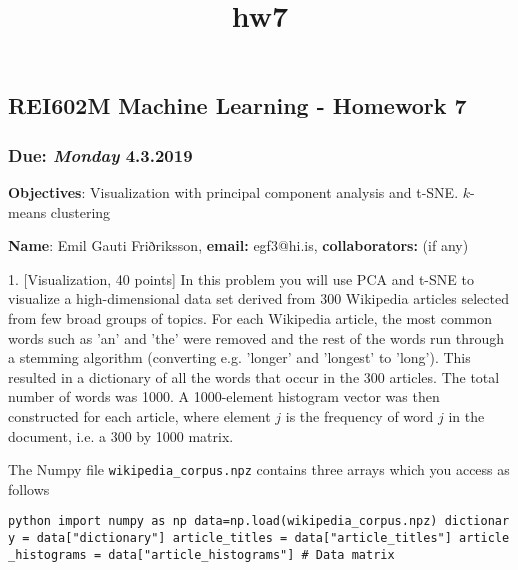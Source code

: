 \documentclass[11pt]{article}
\title{hw7}
\begin{document}
    
    
    \maketitle
    
    

    
    \subsection{REI602M Machine Learning - Homework
7}\label{rei602m-machine-learning---homework-7}

\subsubsection{\texorpdfstring{Due: \emph{Monday}
4.3.2019}{Due: Monday 4.3.2019}}\label{due-monday-4.3.2019}

\textbf{Objectives}: Visualization with principal component analysis and
t-SNE. \(k\)-means clustering

\textbf{Name}: Emil Gauti Friðriksson, \textbf{email: } egf3@hi.is,
\textbf{collaborators:} (if any)

    1. {[}Visualization, 40 points{]} In this problem you will use PCA and
t-SNE to visualize a high-dimensional data set derived from 300
Wikipedia articles selected from few broad groups of topics. For each
Wikipedia article, the most common words such as 'an' and 'the' were
removed and the rest of the words run through a stemming algorithm
(converting e.g. 'longer' and 'longest' to 'long'). This resulted in a
dictionary of all the words that occur in the 300 articles. The total
number of words was 1000. A 1000-element histogram vector was then
constructed for each article, where element \(j\) is the frequency of
word \(j\) in the document, i.e. a 300 by 1000 matrix.

The Numpy file \texttt{wikipedia\_corpus.npz} contains three arrays
which you access as follows

\texttt{python\ import\ numpy\ as\ np\ data=np.load(\textquotesingle{}wikipedia\_corpus.npz\textquotesingle{})\ dictionary\ =\ data{[}"dictionary"{]}\ article\_titles\ =\ data{[}"article\_titles"{]}\ article\_histograms\ =\ data{[}"article\_histograms"{]}\ \#\ Data\ matrix}
\end{document}
